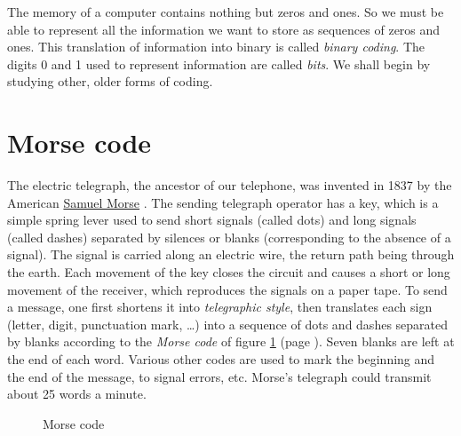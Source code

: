 The memory of a computer contains nothing but zeros and ones. So we must be able to
represent all the information we want to store as sequences of zeros and
ones. This translation of information into binary is called {\em binary coding}. The digits
0 and 1 used to represent information are called {\em bits}. We shall
begin by studying other, older forms of coding.

\section{Morse code}
The electric telegraph, the ancestor of our telephone, was invented in 1837 by
the American \href{https://en.wikipedia.org/wiki/Samuel_Morse}{Samuel Morse} \cite{bertho}. The sending telegraph operator has a key, which is a simple spring
lever used to send short signals (called dots) and long signals (called
dashes) separated by silences or blanks (corresponding to the absence of a signal). The signal is
carried along an electric wire, the return path being through the earth. Each
movement of the key closes the circuit and causes a short or long movement of the receiver,
which reproduces the signals
on a paper tape. To send a message, one first shortens it into {\em telegraphic
style}, then translates each sign (letter, digit, punctuation mark, \ldots) into
a sequence of dots and dashes separated by blanks according to the {\em Morse code} of figure
\ref{fig:codemorse} (page \pageref{fig:codemorse}). Seven blanks are left at the end of each word.
Various other codes are used to mark the beginning and the end of the message, to signal errors,
etc. Morse's telegraph could transmit about 25 words a minute.
\begin{figure}[t]
\vspace{9.3cm}%
%
 \caption{Morse code}\label{fig:codemorse}
\end{figure}

\vspace{5.0cm}

